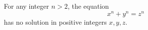 For any integer $n > 2$, the equation
$$x^n + y^n = z^n$$
has no solution in positive integers $x, y, z$.
